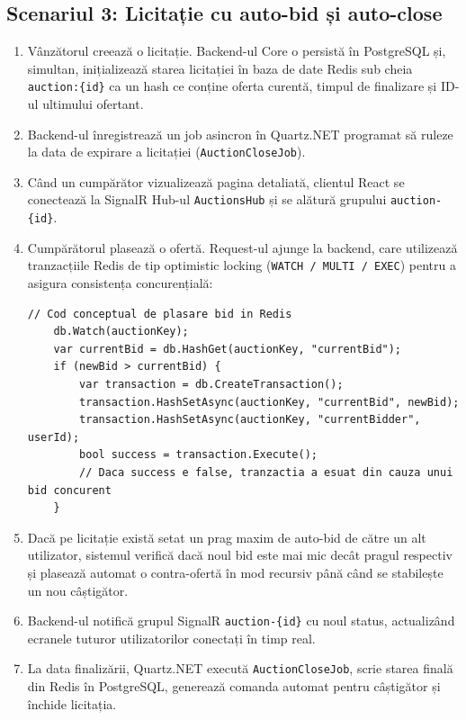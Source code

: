 \subsection{Scenariul 3: Licitație cu auto-bid și auto-close}
\begin{enumerate}
    \item Vânzătorul creează o licitație. Backend-ul Core o persistă în PostgreSQL și, simultan, inițializează starea licitației în baza de date Redis sub cheia \texttt{auction:\{id\}} ca un hash ce conține oferta curentă, timpul de finalizare și ID-ul ultimului ofertant.
    \item Backend-ul înregistrează un job asincron în Quartz.NET programat să ruleze la data de expirare a licitației (\texttt{AuctionCloseJob}).
    \item Când un cumpărător vizualizează pagina detaliată, clientul React se conectează la SignalR Hub-ul \texttt{AuctionsHub} și se alătură grupului \texttt{auction-\{id\}}.
    \item Cumpărătorul plasează o ofertă. Request-ul ajunge la backend, care utilizează tranzacțiile Redis de tip optimistic locking (\texttt{WATCH / MULTI / EXEC}) pentru a asigura consistența concurențială:
    \begin{lstlisting}[language={[sharp]C}]
    // Cod conceptual de plasare bid in Redis
    db.Watch(auctionKey);
    var currentBid = db.HashGet(auctionKey, "currentBid");
    if (newBid > currentBid) {
        var transaction = db.CreateTransaction();
        transaction.HashSetAsync(auctionKey, "currentBid", newBid);
        transaction.HashSetAsync(auctionKey, "currentBidder", userId);
        bool success = transaction.Execute();
        // Daca success e false, tranzactia a esuat din cauza unui bid concurent
    }
    \end{lstlisting}
    \item Dacă pe licitație există setat un prag maxim de auto-bid de către un alt utilizator, sistemul verifică dacă noul bid este mai mic decât pragul respectiv și plasează automat o contra-ofertă în mod recursiv până când se stabilește un nou câștigător.
    \item Backend-ul notifică grupul SignalR \texttt{auction-\{id\}} cu noul status, actualizând ecranele tuturor utilizatorilor conectați în timp real.
    \item La data finalizării, Quartz.NET execută \texttt{AuctionCloseJob}, scrie starea finală din Redis în PostgreSQL, generează comanda automat pentru câștigător și închide licitația.
\end{enumerate}

